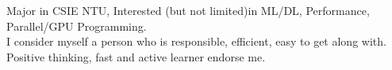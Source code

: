 

\begin{cvparagraph}

Major in CSIE  NTU,  Interested (but not limited)in  ML/DL, Performance, Parallel/GPU Programming. 
\\ I consider myself a person who is responsible, efficient, easy to get along with. Positive thinking, fast and active learner endorse me.
\end{cvparagraph}
